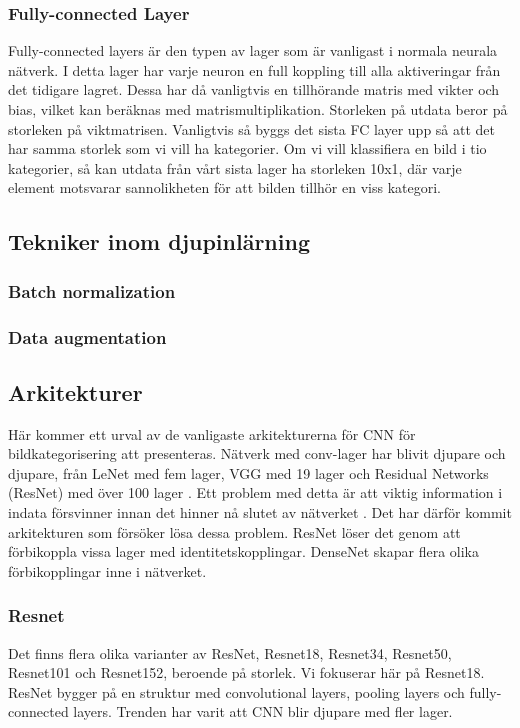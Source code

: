 \documentclass[]{kththesis}
\begin{document}
\subsubsection{Fully-connected Layer}
Fully-connected layers är den typen av lager som är vanligast i normala neurala nätverk. I detta lager har varje neuron en full koppling till alla aktiveringar från det tidigare lagret. Dessa har då vanligtvis en tillhörande matris med vikter och bias, vilket kan beräknas med matrismultiplikation. Storleken på utdata beror på storleken på viktmatrisen. Vanligtvis så byggs det sista FC layer upp så att det har samma storlek som vi vill ha kategorier. Om vi vill klassifiera en bild i tio kategorier, så kan utdata från vårt sista lager ha storleken 10x1, där varje element motsvarar sannolikheten för att bilden tillhör en viss kategori.

\subsection{Tekniker inom djupinlärning}

\subsubsection{Batch normalization}

\subsubsection{Data augmentation}

\subsection{Arkitekturer}
Här kommer ett urval av de vanligaste arkitekturerna för CNN för bildkategorisering att presenteras. Nätverk med conv-lager har blivit djupare och djupare, från LeNet \parencite{lecun1998gradient} med fem lager, VGG med 19 lager \parencite{simonyan2014very} och Residual Networks (ResNet) med över 100 lager \parencite{he2016deep}. Ett problem med detta är att viktig information i indata försvinner innan det hinner nå slutet av nätverket \parencite{huang2017densely}. Det har därför kommit arkitekturen som försöker lösa dessa problem. ResNet löser det genom att förbikoppla vissa lager med identitetskopplingar. DenseNet skapar flera olika förbikopplingar inne i nätverket.

\subsubsection{Resnet}
Det finns flera olika varianter av ResNet, Resnet18, Resnet34, Resnet50, Resnet101 och Resnet152, beroende på storlek. Vi fokuserar här på Resnet18. ResNet bygger på en struktur med convolutional layers, pooling layers och fully-connected layers. Trenden har varit att CNN blir djupare med fler lager.
\end{document}
